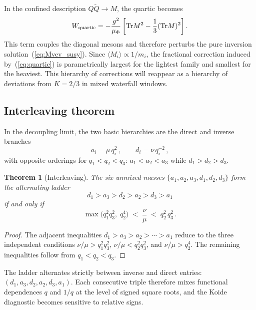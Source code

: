 \documentclass[11pt,a4paper]{article}
\newtheorem{theorem}{Theorem}
\newcommand{\Tr}{\mathrm{Tr}}
\begin{document}
In the confined description $Q\tilde Q\to M$, the quartic becomes
\begin{equation}
  W_{\rm quartic}
  = -\frac{g^2}{\mu_\Phi}\left[\Tr M^2-\frac{1}{3}(\Tr M)^2\right].
  \label{eq:quartic}
\end{equation}
This term couples the diagonal mesons and therefore perturbs the pure
inversion solution~(\ref{eq:Mvev_susy}).  Since $\langle M_i\rangle\propto 1/m_i$,
the fractional correction induced by~(\ref{eq:quartic}) is parametrically
largest for the lightest family and smallest for the heaviest.  This
hierarchy of corrections will reappear as a hierarchy of deviations from
$K=2/3$ in mixed waterfall windows.

\subsection{Interleaving theorem}
\label{sec:interleaving}

In the decoupling limit, the two basic hierarchies are the direct and inverse
branches
\begin{equation}
  a_i=\mu\,q_i^2\,,
  \qquad
  d_i=\nu\,q_i^{-2}\,,
  \label{eq:branches}
\end{equation}
with opposite orderings for $q_1<q_2<q_3$:
$a_1<a_2<a_3$ while $d_1>d_2>d_3$.

\begin{theorem}[Interleaving]
\label{thm:interleaving}
  The six unmixed masses $\{a_1,a_2,a_3,d_1,d_2,d_3\}$ form the alternating ladder
  \begin{equation}
    d_1 > a_3 > d_2 > a_2 > d_3 > a_1
    \label{eq:ladder}
  \end{equation}
  if and only if
  \begin{equation}
    \max\!\bigl(q_1^2 q_3^2,\; q_2^4\bigr)
    \;<\; \frac{\nu}{\mu}
    \;<\; q_2^2\,q_3^2\,.
    \label{eq:window}
  \end{equation}
\end{theorem}

\begin{proof}
  The adjacent inequalities $d_1>a_3>a_2>\cdots>a_1$ reduce to the three
  independent conditions
  $\nu/\mu>q_1^2q_3^2$, $\nu/\mu<q_2^2q_3^2$, and $\nu/\mu>q_2^4$.
  The remaining inequalities follow from $q_1<q_2<q_3$.
\end{proof}

The ladder alternates strictly between inverse and direct entries:
$(d_1,a_3,d_2,a_2,d_3,a_1)$.  Each consecutive triple therefore mixes
functional dependences $q$ and $1/q$ at the level of signed square roots,
and the Koide diagnostic becomes sensitive to relative signs.
\end{document}
